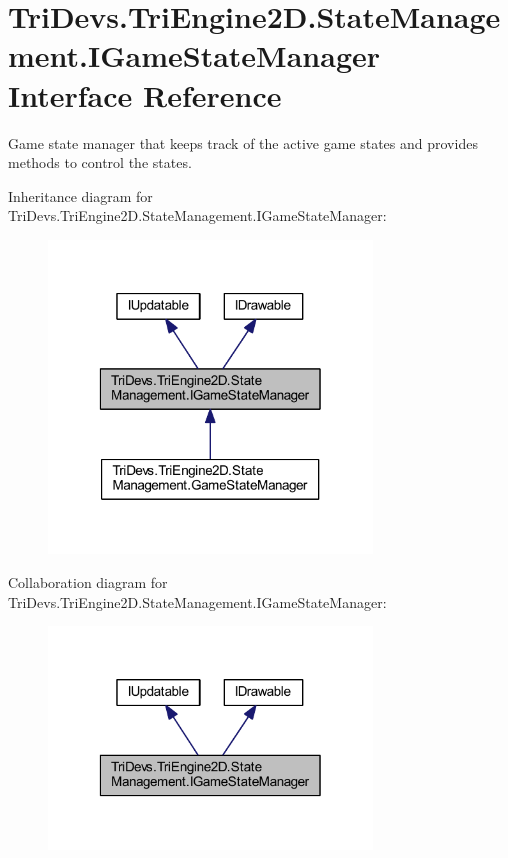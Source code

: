 \hypertarget{interface_tri_devs_1_1_tri_engine2_d_1_1_state_management_1_1_i_game_state_manager}{\section{Tri\-Devs.\-Tri\-Engine2\-D.\-State\-Management.\-I\-Game\-State\-Manager Interface Reference}
\label{interface_tri_devs_1_1_tri_engine2_d_1_1_state_management_1_1_i_game_state_manager}
}


Game state manager that keeps track of the active game states and provides methods to control the states.  




Inheritance diagram for Tri\-Devs.\-Tri\-Engine2\-D.\-State\-Management.\-I\-Game\-State\-Manager\-:\nopagebreak
\begin{figure}[H]
\begin{center}
\leavevmode
\includegraphics[width=244pt]{interface_tri_devs_1_1_tri_engine2_d_1_1_state_management_1_1_i_game_state_manager__inherit__graph}
\end{center}
\end{figure}


Collaboration diagram for Tri\-Devs.\-Tri\-Engine2\-D.\-State\-Management.\-I\-Game\-State\-Manager\-:\nopagebreak
\begin{figure}[H]
\begin{center}
\leavevmode
\includegraphics[width=244pt]{interface_tri_devs_1_1_tri_engine2_d_1_1_state_management_1_1_i_game_state_manager__coll__graph}
\end{center}
\end{figure}
